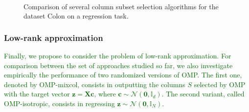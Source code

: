 \documentclass[twoside,11pt]{book}
\newcommand{\rev}[1]{\textcolor{darkgreen}{#1}}
\numberwithin{theorem}{chapter}
\numberwithin{definition}{chapter}
\numberwithin{proposition}{chapter}
\numberwithin{corollary}{chapter}
\numberwithin{example}{chapter}
\numberwithin{lemma}{chapter}
\begin{document}
\begin{figure}
    \centering
    \captionsetup[subfigure]{justification=centering}
~
\caption{Comparison of several column subset selection algorithms for the dataset Colon on a regression task. \label{fig:supervised_and_unsupervised_regression}}
\end{figure}


\subsubsection{Low-rank approximation}\label{sec:num_sim_OMP_vs_CSSP_in_CSSP}
%
\rev{Finally, we propose to consider the problem of low-rank approximation.
For comparison between the set of approaches studied so far, we also  investigate empirically the performance of two randomized versions of OMP.
The first one, denoted by OMP-mixcol, consists in outputting the columns $S$ selected by OMP with the target vector $\mathbf{z} = \bm{X} \bm{c}$, where $\bm{c} \sim \mathcal{N}(\bm{0}, \mathbb{I}_{d})$. The second variant, called OMP-isotropic, consists in regressing
$\mathbf{z} \sim \mathcal{N}(\bm{0}, \mathbb{I}_{N})$.}
\end{document}
